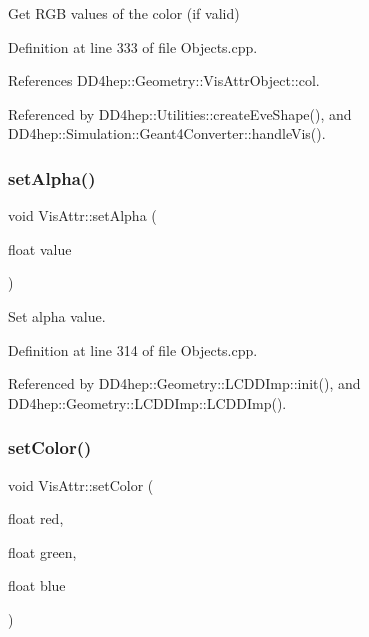 Get R\+GB values of the color (if valid) 



Definition at line 333 of file Objects.\+cpp.



References D\+D4hep\+::\+Geometry\+::\+Vis\+Attr\+Object\+::col.



Referenced by D\+D4hep\+::\+Utilities\+::create\+Eve\+Shape(), and D\+D4hep\+::\+Simulation\+::\+Geant4\+Converter\+::handle\+Vis().

\hypertarget{class_d_d4hep_1_1_geometry_1_1_vis_attr_aeca9848b297213098eac1fd882fd7680}{}\label{class_d_d4hep_1_1_geometry_1_1_vis_attr_aeca9848b297213098eac1fd882fd7680} 
\subsubsection{\texorpdfstring{set\+Alpha()}{setAlpha()}}
{\footnotesize\ttfamily void Vis\+Attr\+::set\+Alpha (\begin{DoxyParamCaption}\item[{float}]{value }\end{DoxyParamCaption})}



Set alpha value. 



Definition at line 314 of file Objects.\+cpp.



Referenced by D\+D4hep\+::\+Geometry\+::\+L\+C\+D\+D\+Imp\+::init(), and D\+D4hep\+::\+Geometry\+::\+L\+C\+D\+D\+Imp\+::\+L\+C\+D\+D\+Imp().

\hypertarget{class_d_d4hep_1_1_geometry_1_1_vis_attr_aa9f0dec964e94cbb6df397e242ac57b5}{}\label{class_d_d4hep_1_1_geometry_1_1_vis_attr_aa9f0dec964e94cbb6df397e242ac57b5} 
\subsubsection{\texorpdfstring{set\+Color()}{setColor()}}
{\footnotesize\ttfamily void Vis\+Attr\+::set\+Color (\begin{DoxyParamCaption}\item[{float}]{red,  }\item[{float}]{green,  }\item[{float}]{blue }\end{DoxyParamCaption})}




